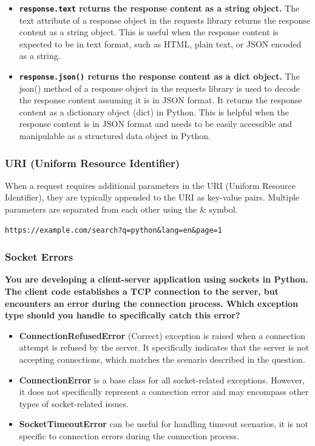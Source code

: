 \begin{itemize}
\item \textbf{\texttt{response.text} returns the response content as a string object.} The text attribute of a response object in the requests library returns the response content as a string object. This is useful when the response content is expected to be in text format, such as HTML, plain text, or JSON encoded as a string.

\item \textbf{\texttt{response.json()} returns the response content as a dict object.} The json() method of a response object in the requests library is used to decode the response content assuming it is in JSON format. It returns the response content as a dictionary object (dict) in Python. This is helpful when the response content is in JSON format and needs to be easily accessible and manipulable as a structured data object in Python.
\end{itemize}

\subsubsection{URI (Uniform Resource Identifier)}

When a request requires additional parameters in the URI (Uniform Resource Identifier), they are typically appended to the URI as key-value pairs. Multiple parameters are separated from each other using the \& symbol.

\begin{codebox}
\begin{verbatim}
https://example.com/search?q=python&lang=en&page=1
\end{verbatim}
\end{codebox}

\subsubsection{Socket Errors}
\textbf{You are developing a client-server application using sockets in Python. The client code establishes a TCP connection to the server, but encounters an error during the connection process. Which exception type should you handle to specifically catch this error?}\\

\begin{itemize}
\item \textbf{ConnectionRefusedError} (Correct) exception is raised when a connection attempt is refused by the server. It specifically indicates that the server is not accepting connections, which matches the scenario described in the question.

\item \textbf{ConnectionError} is a base class for all socket-related exceptions. However, it does not specifically represent a connection error and may encompass other types of socket-related issues.

\item \textbf{SocketTimeoutError} can be useful for handling timeout scenarios, it is not specific to connection errors during the connection process.
\end{itemize}

